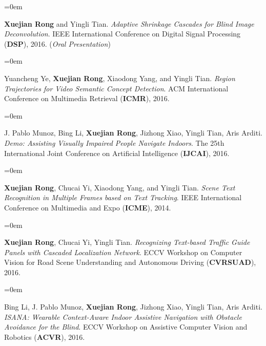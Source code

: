 \documentclass{scrartcl}
\newcommand{\Description}[1]{\hangindent=0em\hangafter=0\noindent\raggedright\footnotesize{#1}\par\normalsize\vspace{1em}} %
\begin{document}
\begin{cv}{}
\Description{\scriptsize
\textbf{Xuejian Rong} and Yingli Tian. \textit{Adaptive Shrinkage Cascades for Blind Image Deconvolution}. IEEE International Conference on Digital Signal Processing (\textbf{DSP}), 2016. (\textit{Oral Presentation})}

\Description{\scriptsize
Yuancheng Ye, \textbf{Xuejian Rong}, Xiaodong Yang, and Yingli Tian. \textit{Region Trajectories for Video Semantic Concept Detection}. ACM International Conference on Multimedia Retrieval (\textbf{ICMR}), 2016.}

\Description{\scriptsize
J. Pablo Munoz, Bing Li, \textbf{Xuejian Rong}, Jizhong Xiao, Yingli Tian, Aris Arditi. \textit{Demo: Assisting Visually Impaired People Navigate Indoors}. The 25th International Joint Conference on Artificial Intelligence (\textbf{IJCAI}), 2016.}


\Description{\scriptsize
\textbf{Xuejian Rong}, Chucai Yi, Xiaodong Yang, and Yingli Tian. \textit{Scene Text Recognition in Multiple Frames based on Text Tracking}. IEEE International Conference on Multimedia and Expo (\textbf{ICME}), 2014.}

\Description{\scriptsize
\textbf{Xuejian Rong}, Chucai Yi, Yingli Tian. \textit{Recognizing Text-based Traffic Guide Panels with Cascaded Localization Network}. ECCV Workshop on Computer Vision for Road Scene Understanding and Autonomous Driving (\textbf{CVRSUAD}), 2016.}

\Description{\scriptsize
Bing Li, J. Pablo Munoz, \textbf{Xuejian Rong}, Jizhong Xiao, Yingli Tian, Aris Arditi. \textit{ISANA: Wearable Context-Aware Indoor Assistive Navigation with Obstacle Avoidance for the Blind}. \scriptsize{ECCV Workshop on Assistive Computer Vision and Robotics} (\textbf{ACVR}), 2016.}


\vspace{1.0em} %




\end{cv}
\end{document}
